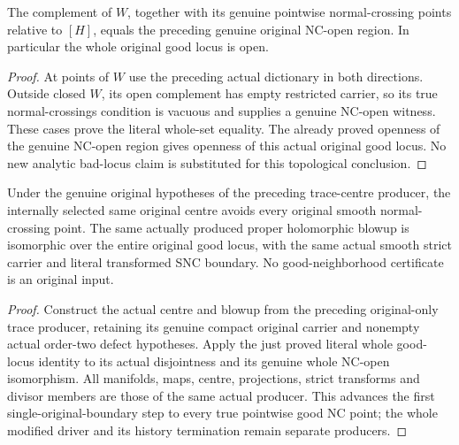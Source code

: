 \begin{theorem}
\label{hir:sharp-original-pointwise-good-locus-whole-open-dictionary}
\leanok
The complement of $W$, together with its genuine pointwise normal-crossing
points relative to $[H]$, equals the preceding genuine original NC-open
region. In particular the whole original good locus is open.
\end{theorem}
\begin{proof}
At points of $W$ use the preceding actual dictionary in both directions.
Outside closed $W$, its open complement has empty restricted carrier,
so its true normal-crossings condition is vacuous and supplies a genuine
NC-open witness. These cases prove the literal whole-set equality.
The already proved openness of the genuine NC-open region gives
openness of this actual original good locus. No new analytic bad-locus
claim is substituted for this topological conclusion.
\end{proof}

\begin{theorem}
\label{hir:sharp-single-boundary-original-pointwise-preserving-blowup}
\leanok
Under the genuine original hypotheses of the preceding trace-centre
producer, the internally selected same original centre avoids every
original smooth normal-crossing point. The same actually produced proper
holomorphic blowup is isomorphic over the entire original good locus,
with the same actual smooth strict carrier and literal transformed SNC
boundary. No good-neighborhood certificate is an original input.
\end{theorem}
\begin{proof}
Construct the actual centre and blowup from the preceding original-only
trace producer, retaining its genuine compact original carrier and
nonempty actual order-two defect hypotheses. Apply the just proved
literal whole good-locus identity to its actual disjointness and its
genuine whole NC-open isomorphism. All manifolds, maps, centre,
projections, strict transforms and divisor members are those of the
same actual producer. This advances the first single-original-boundary
step to every true pointwise good NC point; the whole modified driver
and its history termination remain separate producers.
\end{proof}

